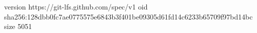 version https://git-lfs.github.com/spec/v1
oid sha256:128dbb0fc7ae0775575e6843b3f401be09305d61fd14c6233b65709f97bd14bc
size 5051
